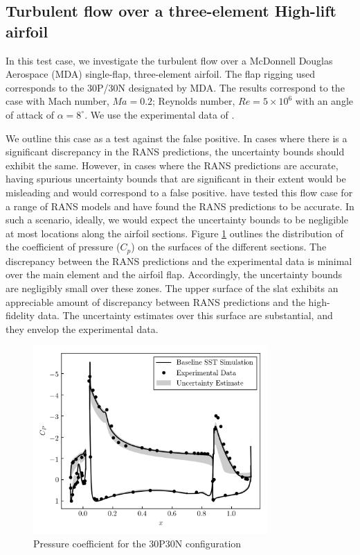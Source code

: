 \subsection{Turbulent flow over a three-element High-lift airfoil}

In this test case, we investigate the turbulent flow over a McDonnell Douglas Aerospace (MDA) single-flap, three-element airfoil.
The flap rigging used corresponds to the 30P/30N designated by MDA.
The results correspond to the case with Mach number, $Ma=0.2$; Reynolds number, $Re=5 \times 10^6$ with an angle of attack of $\alpha=8^{\circ}$.
We use the experimental data of \cite{chin1993}.

We outline this case as a test against the false positive.
In cases where there is a significant discrepancy in the RANS predictions, the uncertainty bounds should exhibit the same.
However, in cases where the RANS predictions are accurate, having spurious uncertainty bounds that are significant in their extent would be misleading and would correspond to a false positive.
\cite{klausmeyer1997} have tested this flow case for a range of RANS models and have found the RANS predictions to be accurate.
In such a scenario, ideally, we would expect the uncertainty bounds to be negligible at most locations along the airfoil sections.
Figure \ref{fig:30p30n} outlines the distribution of the coefficient of pressure ($C_p$) on the surfaces of the different sections.
The discrepancy between the RANS predictions and the experimental data is minimal over the main element and the airfoil flap.
Accordingly, the uncertainty bounds are negligibly small over these zones.
The upper surface of the slat exhibits an appreciable amount of discrepancy between RANS predictions and the high-fidelity data.
The uncertainty estimates over this surface are substantial, and they envelop the experimental data.

\begin{figure}
\center
\includegraphics[width=0.8\textwidth]{suthesis/images/30p30n_5p5aoa_cp.png}
\caption{Pressure coefficient for the 30P30N configuration\label{fig:30p30n}}
\end{figure}